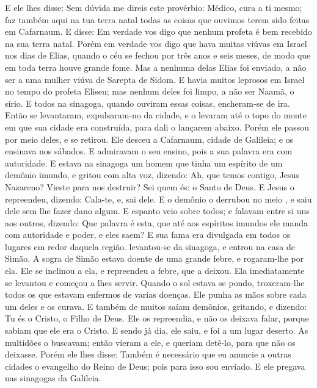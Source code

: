 {  E ele lhes disse: Sem dúvida me direis este provérbio: Médico, cura a ti mesmo; faz também aqui na tua terra natal todas as coisas que ouvimos terem sido feitas em Cafarnaum.
  E disse: Em verdade vos digo que nenhum profeta é bem recebido na sua terra natal.
  Porém em verdade vos digo que hava muitas viúvas em Israel nos dias de Elias, quando o céu se fechou por três anos e seis meses, de modo que em toda
{} terra houve grande fome.
  Mas a nenhuma delas Elias foi enviado, a não ser a uma mulher viúva de Sarepta de Sidom.
  E havia muitos leprosos em Israel no tempo do profeta Eliseu; mas nenhum deles foi limpo, a não ser Naamã, o sírio.
  E todos na sinagoga, quando ouviram essas coisas, encheram-se de ira.
  Então se levantaram, expulsaram-no da cidade, e o levaram até o topo do monte em que sua cidade era construída, para dali o lançarem abaixo.
  Porém ele passou por meio deles, e se retirou.
  Ele desceu a Cafarnaum, cidade de Galileia; e
{} os ensinava nos sábados.
  E admiravam o seu ensino, pois a sua palavra era com autoridade.
  E estava na sinagoga um homem que tinha um espírito de um demônio imundo, e gritou com alta voz,
  dizendo: Ah, que temos contigo, Jesus Nazareno? Vieste para nos destruir? Sei quem és: o Santo de Deus.
  E Jesus o repreendeu, dizendo: Cala-te, e, sai dele. E o demônio o derrubou no meio
{},  e saiu dele sem lhe fazer dano algum.
  E espanto veio sobre todos; e falavam entre si uns aos outros, dizendo: Que palavra é esta, que até aos espíritos imundos ele manda com autoridade e poder, e eles saem?
  E sua fama era divulgada em todos os lugares em redor daquela região.
   levantou-se da sinagoga, e entrou na casa de Simão. A sogra de Simão estava doente de uma grande febre, e rogaram-lhe por ela.
  Ele se inclinou a ela, e repreendeu a febre, que a deixou. Ela imediatamente se levantou e começou a lhes servir.
  Quando o sol estava se pondo, troxeram-lhe todos os que estavam enfermos de varias doenças. Ele punha as mãos sobre cada um deles e os curava.
  E também de muitos saíam demônios, gritando, e dizendo: Tu és o Cristo, o Filho de Deus. Ele os repreendia, e não os deixava falar, porque sabiam que ele era o Cristo.
  E sendo já dia, ele saiu, e foi a um lugar deserto. As multidões o buscavam; então vieram a ele, e queriam detê-lo, para que não os deixasse.
  Porém ele lhes disse: Também é necessário que eu anuncie a outras cidades o evangelho do Reino de Deus; pois para isso sou enviado.
  E ele pregava nas sinagogas da Galileia.
\par }

